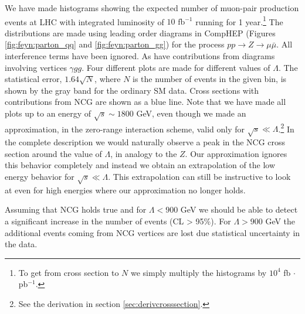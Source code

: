 We have made histograms showing the expected number of muon-pair production events at LHC with integrated luminosity of $10 \textrm{ fb}^{-1}$ running for 1 year.\footnote{To get from cross section to $N$ we simply multiply the histograms by $10^4$ fb $\cdot$ pb$^{-1}$.} The distributions are made using leading order diagrams in CompHEP (Figures \ref{fig:feyn:parton_qq} and \ref{fig:feyn:parton_gg}) for the process $pp \rightarrow Z \rightarrow \mu \bar \mu$. All interference terms have been ignored. As have contributions from diagrams involving vertices $\gamma gg$. Four different plots are made for different values of $\Lambda$. The statistical error, $1.64\sqrt{N}$, where $N$ is the number of events in the given bin, is shown by the gray band for the ordinary SM data. Cross sections with contributions from NCG are shown as a blue line. Note that we have made all plots up to an energy of $\sqrt{s} \sim 1800$ GeV, even though we made an approximation, in the zero-range interaction scheme, valid only for $\sqrt{s} \ll \Lambda$.\footnote{See the derivation in section \ref{sec:derivcrosssection}.} In the complete description we would naturally observe a peak in the NCG cross section around the value of $\Lambda$, in analogy to the $Z$. Our approximation ignores this behavior completely and instead we obtain an extrapolation of the low energy behavior for $\sqrt{s} \ll \Lambda$. This extrapolation can still be instructive to look at even for high energies where our approximation no longer holds.

Assuming that NCG holds true and for $\Lambda < 900$ GeV we should be able to detect a significant increase in the number of events (CL > 95\%). For $\Lambda > 900$ GeV the additional events coming from NCG vertices are lost due statistical uncertainty in the data.